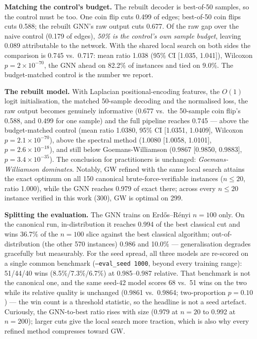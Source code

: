 \documentclass[11pt]{article}
\begin{document}
\textbf{Matching the control's budget.} The rebuilt decoder is best-of-50 samples, so the control must be too. One coin flip cuts 0.499 of edges; best-of-50 coin flips cuts 0.588; the rebuilt GNN's raw output cuts 0.677. Of the raw gap over the naive control (0.179 of edges), \emph{50\% is the control's own sample budget}, leaving 0.089 attributable to the network. With the shared local search on both sides the comparison is 0.745 vs.\ 0.717: mean ratio 1.038 (95\% CI [1.035, 1.041]), Wilcoxon $p = 2\times10^{-70}$, the GNN ahead on 82.2\% of instances and tied on 9.0\%. The budget-matched control is the number we report.

\textbf{The rebuilt model.} With Laplacian positional-encoding features, the $O(1)$ logit initialisation, the matched 50-sample decoding and the normalised loss, the raw output becomes genuinely informative (0.677 vs.\ the 50-sample coin flip's 0.588, and 0.499 for one sample) and the full pipeline reaches 0.745 --- above the budget-matched control (mean ratio 1.0380, 95\% CI [1.0351, 1.0409], Wilcoxon $p = 2.1\times10^{-70}$), above the spectral method (1.0080 [1.0058, 1.0101], $p = 2.6\times10^{-18}$), and still below Goemans-Williamson (0.9867 [0.9850, 0.9883], $p = 3.4\times10^{-35}$). The conclusion for practitioners is unchanged: \emph{Goemans-Williamson dominates}. Notably, GW refined with the same local search attains the exact optimum on all 150 canonical brute-force-verifiable instances ($n \leq 20$, ratio 1.000), while the GNN reaches 0.979 of exact there; across every $n \leq 20$ instance verified in this work (300), GW is optimal on 299.

\textbf{Splitting the evaluation.} The GNN trains on Erd\H{o}s--R\'enyi $n{=}100$ only. On the canonical run, in-distribution it reaches 0.994 of the best classical cut and wins 36.7\% of the $n{=}100$ slice against the best classical algorithm; out-of-distribution (the other 570 instances) 0.986 and 10.0\% --- generalisation degrades gracefully but measurably. For the seed spread, all three models are re-scored on a single common benchmark (\texttt{--eval\_seed 1000}, beyond every training range): 51/44/40 wins (8.5\%/7.3\%/6.7\%) at 0.985--0.987 relative. That benchmark is not the canonical one, and the same seed-42 model scores 68 vs.\ 51 wins on the two while its relative quality is unchanged (0.9861 vs.\ 0.9864; two-proportion $p=0.10$) --- the win count is a threshold statistic, so the headline is not a seed artefact. Curiously, the GNN-to-best ratio rises with size (0.979 at $n{=}20$ to 0.992 at $n{=}200$); larger cuts give the local search more traction, which is also why every refined method compresses toward GW.
\end{document}
